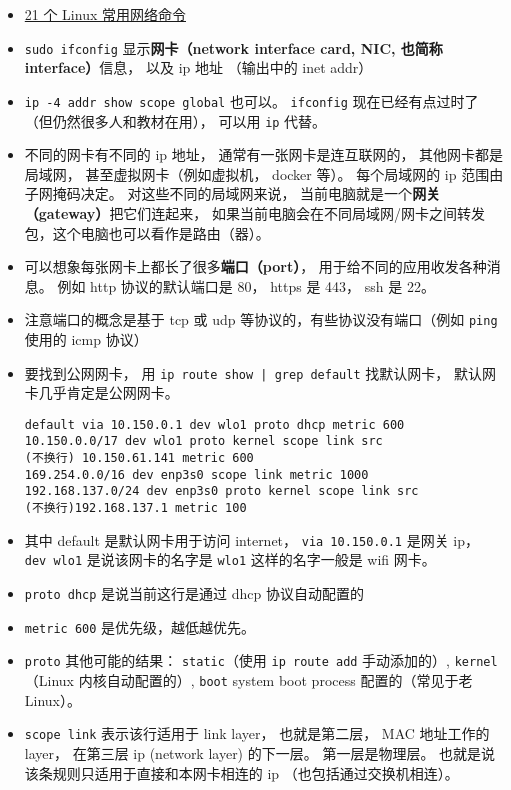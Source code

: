 
\begin{itemize}
\item \href{https://itsfoss.com/basic-linux-networking-commands/}{21 个 Linux 常用网络命令}
\item \verb`sudo ifconfig` 显示\textbf{网卡（network interface card, NIC, 也简称 interface）}信息， 以及 ip 地址 （输出中的 inet addr）
\item \verb`ip -4 addr show scope global` 也可以。 \verb`ifconfig` 现在已经有点过时了（但仍然很多人和教材在用）， 可以用 \verb`ip` 代替。
\item 不同的网卡有不同的 ip 地址， 通常有一张网卡是连互联网的， 其他网卡都是局域网， 甚至虚拟网卡（例如虚拟机， docker 等）。 每个局域网的 ip 范围由子网掩码决定。 对这些不同的局域网来说， 当前电脑就是一个\textbf{网关（gateway）}把它们连起来， 如果当前电脑会在不同局域网/网卡之间转发包，这个电脑也可以看作是路由（器）。
\item 可以想象每张网卡上都长了很多\textbf{端口（port）}， 用于给不同的应用收发各种消息。 例如 http 协议的默认端口是 80， https 是 443， ssh 是 22。
\item 注意端口的概念是基于 tcp 或 udp 等协议的，有些协议没有端口（例如 \verb`ping` 使用的 icmp 协议）
\item 要找到公网网卡， 用 \verb`ip route show | grep default` 找默认网卡， 默认网卡几乎肯定是公网网卡。
\begin{lstlisting}[language=none]
default via 10.150.0.1 dev wlo1 proto dhcp metric 600
10.150.0.0/17 dev wlo1 proto kernel scope link src
(不换行) 10.150.61.141 metric 600
169.254.0.0/16 dev enp3s0 scope link metric 1000
192.168.137.0/24 dev enp3s0 proto kernel scope link src
(不换行)192.168.137.1 metric 100
\end{lstlisting}
\item 其中 default 是默认网卡用于访问 internet， \verb`via 10.150.0.1` 是网关 ip， \verb`dev wlo1` 是说该网卡的名字是 \verb`wlo1` 这样的名字一般是 wifi 网卡。
\item \verb`proto dhcp` 是说当前这行是通过 dhcp 协议自动配置的
\item \verb`metric 600` 是优先级，越低越优先。
\item \verb`proto` 其他可能的结果： \verb`static`（使用 \verb`ip route add` 手动添加的）, \verb`kernel`（Linux 内核自动配置的）, \verb`boot` system boot process 配置的（常见于老 Linux）。
\item \verb`scope link` 表示该行适用于 link layer， 也就是第二层， MAC 地址工作的 layer， 在第三层 ip (network layer) 的下一层。 第一层是物理层。 也就是说该条规则只适用于直接和本网卡相连的 ip （也包括通过交换机相连）。

\end{itemize}
